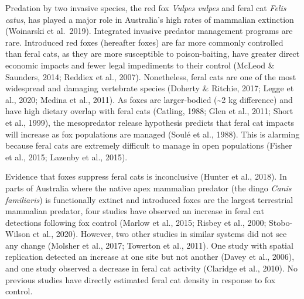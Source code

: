 \documentclass[]{elsarticle} %
\begin{document}
Predation by two invasive species, the red fox \emph{Vulpes vulpes} and feral cat \emph{Felis catus}, has played a major role in Australia's high rates of mammalian extinction (Woinarski et al.~2019). Integrated invasive predator management programs are rare. Introduced red foxes (hereafter foxes) are far more commonly controlled than feral cats, as they are more susceptible to poison-baiting, have greater direct economic impacts and fewer legal impediments to their control (McLeod \& Saunders, 2014; Reddiex et al., 2007). Nonetheless, feral cats are one of the most widespread and damaging vertebrate species (Doherty \& Ritchie, 2017; Legge et al., 2020; Medina et al., 2011). As foxes are larger-bodied (\textasciitilde2 kg difference) and have high dietary overlap with feral cats (Catling, 1988; Glen et al., 2011; Short et al., 1999), the mesopredator release hypothesis predicts that feral cat impacts will increase as fox populations are managed (Soulé et al., 1988). This is alarming because feral cats are extremely difficult to manage in open populations (Fisher et al., 2015; Lazenby et al., 2015).

Evidence that foxes suppress feral cats is inconclusive (Hunter et al., 2018). In parts of Australia where the native apex mammalian predator (the dingo \emph{Canis familiaris}) is functionally extinct and introduced foxes are the largest terrestrial mammalian predator, four studies have observed an increase in feral cat detections following fox control (Marlow et al., 2015; Risbey et al., 2000; Stobo-Wilson et al., 2020). However, two other studies in similar systems did not see any change (Molsher et al., 2017; Towerton et al., 2011). One study with spatial replication detected an increase at one site but not another (Davey et al., 2006), and one study observed a decrease in feral cat activity (Claridge et al., 2010). No previous studies have directly estimated feral cat density in response to fox control.
\end{document}
